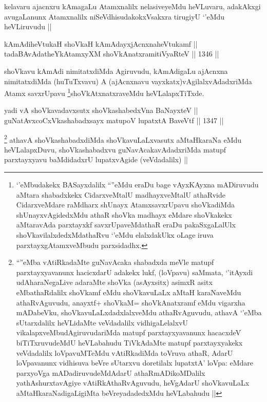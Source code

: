 \begin{artha}
kelavaru ajacnxru kAmagaLu Atamxnalilx nelasiveyeMdu heVLuvaru, adakAkxgi avugaLanunx Atamxnalilx niSeVdhisudakokxVsakxra tirugiyU `\stext'eMdu heVLiruvudu ||
\end{artha}


\begin{shl}
kAmAdiheVtukaH shoVkaH kAmAdayxjAcnxnaheVtukamf || \\
tadaBAvAdatheYkAtamxyXM shoVkAnatxramitiVyaRteV ||  1346 ||  
\end{shl}

\begin{artha}
shoVkavu kAmAdi nimitatxdiMda Agiruvudu, kAmAdigaLu ajAcnxna nimitatxdiMda (huTuTxvavu) A (ajAcnxnavu vayxkatx)vAgilalxvAdadxriMda Atamx savxrUpavu \footnote{`\stext'eMbudakekx BASayxdalilx ``\stext''eMdu eraDu bage vAyxKAyxna mADiruvudu aMtara shabadxkekx CidarxveMtalU madhayxveMtalU athaRvide CidarxveMdare raMdharx shUnayx AtamxsavxrUpavu shoVkadiMda shUnayxvAgidedxMdu athaR shoVka madhayx eMdare shoVkakekx aMtaravAda parxtayxkf savxrUpaveMdathaR eraDu pakaSxgaLalUlx shoVkavilalxdedxMdathaRvu `\stext'eMdu elalxdakUkx oLage iruva parxtayxgAtamxveMbudu parxsidadhx.}shoVkAtxnatxraveMdu heVLalapxTiTxde.
\end{artha}


\begin{shl}
yadi vA shoVkavadavxsutx shoVkashabedxVna BaNayxteV || \\
guNatAvxcoCxVkashabadxsayx matupoV lupatxtA BaveVtf ||  1347 ||  
\end{shl}

\begin{artha}
\footnote{``\stext''eMba vAtiRkadaMte guNavAcaka shabadxda meVle matupf parxtayxyavanunx hacicxdarU adakekx lukf, (loVpavu) saMmata, `\stext'itAyxdi udAharaNegaLive adaraMte shoVka (asAyxsitx) asimxR asitx eMbathaRdalilx shoVkamf eMdu shoVkavuLaLx aMtaH karaNaveMdu athaRvAguvudu, anayxtf+ shoVkaM= shoVkAnatxramf eMdu vigarxha mADabeVku, shoVkavuLaLxdadxlalxveMdu athaRvAguvudu, athavA `\stext'eMba sUtarxdalilx heVLidaMte veVdadalilx vidhigaLelalxvU vikalapxveMbudAgiruvudariMda matupf parxtayxyavanunx hacacxdeV biTiTxruvudeMdU heVLabahudu TiVkAdaMte matupf parxtayxyakekx veVdadalilx loVpavuMTeMdu vAtiRkadiMda toVruva athaR, AdarU loVpavanunx vidhisuva beVre sUtarxvu doretilalx lupatxtA' loVpa: eMdare parxyoVga mADadiruvudeMdAdarU athaRmADikoMDalilx yathAshurxtavAgiye vAtiRkAthaRvAguvudu, heVgAdarU shoVkavuLaLx aMtaHkaraNadigaLigiMta beVreyadadedxMdu heVLabahudu ||}
athavA shoVkashabadxdiMda shoVkavuLaLxvasutx aMtaHkaraNa eMdu heVLalapxDuvu, shoVkashabadxvu guNavAcakavAdadxriMda matupf parxtayxyavu baMdidadxrU lupatxvAgide (veVdadalilx) ||  
\end{artha}

